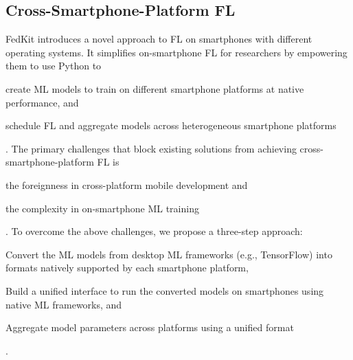 \documentclass[letterpaper]{article} %
\begin{document}
\subsection{Cross-Smartphone-Platform FL}

FedKit introduces a novel approach to FL on smartphones
with different operating systems.
It simplifies on-smartphone FL for researchers by empowering them to
use Python to
\begin{enumerate*}[label=\arabic*)]
    \item create ML models to train on different smartphone platforms at
        native performance, and
    \item schedule FL and aggregate models across
        heterogeneous smartphone platforms
\end{enumerate*}.
The primary challenges that block existing solutions from
achieving cross-smartphone-platform FL is
\begin{enumerate*}[label=\arabic*)]
    \item the foreignness in cross-platform mobile development and
    \item the complexity in on-smartphone ML training
\end{enumerate*}.
To overcome the above challenges, we propose a three-step approach:
\begin{enumerate*}[label=\arabic*.]
    \item Convert the ML models from desktop ML frameworks (e.g., TensorFlow)
        into formats natively supported by each smartphone platform,
    \item Build a unified interface to run the converted models on smartphones
        using native ML frameworks, and
    \item Aggregate model parameters across platforms using a unified format
\end{enumerate*}.
\end{document}

